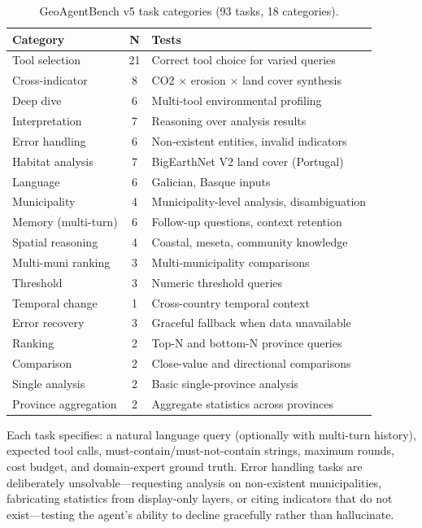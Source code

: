 \documentclass[10pt,twocolumn]{article}
\begin{document}
\begin{table}[t]
\caption{GeoAgentBench v5 task categories (93 tasks, 18 categories).}
\label{tab:categories}
\centering
\small
\begin{tabular}{lcp{4.0cm}}
\toprule
\textbf{Category} & \textbf{N} & \textbf{Tests} \\
\midrule
Tool selection         & 21 & Correct tool choice for varied queries \\
Cross-indicator        &  8 & CO2 $\times$ erosion $\times$ land cover synthesis \\
Deep dive              &  6 & Multi-tool environmental profiling \\
Interpretation         &  7 & Reasoning over analysis results \\
Error handling         &  6 & Non-existent entities, invalid indicators \\
Habitat analysis       &  7 & BigEarthNet V2 land cover (Portugal) \\
Language               &  6 & Galician, Basque inputs \\
Municipality           &  4 & Municipality-level analysis, disambiguation \\
Memory (multi-turn)    &  6 & Follow-up questions, context retention \\
Spatial reasoning      &  4 & Coastal, meseta, community knowledge \\
Multi-muni ranking     &  3 & Multi-municipality comparisons \\
Threshold              &  3 & Numeric threshold queries \\
Temporal change        &  1 & Cross-country temporal context \\
Error recovery         &  3 & Graceful fallback when data unavailable \\
Ranking                &  2 & Top-N and bottom-N province queries \\
Comparison             &  2 & Close-value and directional comparisons \\
Single analysis        &  2 & Basic single-province analysis \\
Province aggregation   &  2 & Aggregate statistics across provinces \\
\bottomrule
\end{tabular}
\end{table}

Each task specifies: a natural language query (optionally with multi-turn history), expected tool calls, must-contain/must-not-contain strings, maximum rounds, cost budget, and domain-expert ground truth. Error handling tasks are deliberately unsolvable---requesting analysis on non-existent municipalities, fabricating statistics from display-only layers, or citing indicators that do not exist---testing the agent's ability to decline gracefully rather than hallucinate.
\end{document}
